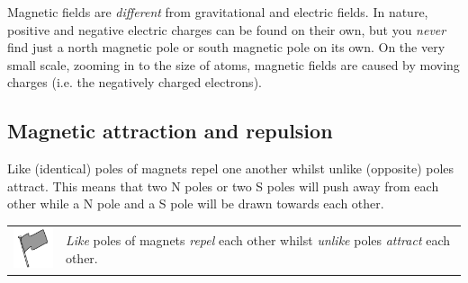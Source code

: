     \addtocounter{footnote}{-0}
    
        \par 
        \label{m37830*id128737}Magnetic fields are \textsl{different} from gravitational and electric
fields. In nature, positive and negative electric charges can be found
on their own, but you \textsl{never} find just a north magnetic pole or south magnetic pole on its
own. On the very small scale, zooming in to the size of atoms, magnetic fields are caused by
moving charges (i.e. the negatively charged electrons).\par 
      
      \label{m37830*uid17}
            \subsection{ Magnetic attraction and repulsion}
            \nopagebreak
            
        
        \label{m37830*id128763}Like (identical) poles of magnets repel one another whilst unlike (opposite) poles attract. This means that two N poles or two S poles will push away from each other while a N
pole and a S pole will be drawn towards each other.\par 
\label{m37830*fhsst!!!underscore!!!id162}\begin{definition}
	  \begin{tabular*}{15 cm}{m{15 mm}m{}}
	\hspace*{-50pt}  \includegraphics[width=0.5in]{col11305.imgs/psflag2.png}   & \Definition{   \label{id2471643}\textbf{ Attraction and Repulsion }} { \label{m37830*meaningfhsst!!!underscore!!!id162}
        \label{m37830*id128774}\textsl{Like} poles of magnets \textsl{repel}
each other whilst \textsl{unlike} poles \textsl{attract} each other. \par 
         } 
      \end{tabular*}
      \end{definition}

\label{m37830*secfhsst!!!underscore!!!id166}\vspace{.5cm} 
      
